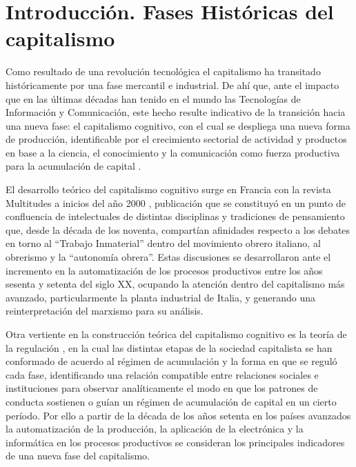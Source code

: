 \documentclass[
  spanish,
  11pt,
  a4paper,
]{scrbook}
\begin{document}
\section*{Introducción. Fases Históricas del
capitalismo}\label{introducciuxf3n.-fases-histuxf3ricas-del-capitalismo}


Como resultado de una revolución tecnológica el capitalismo ha
transitado históricamente por una fase mercantil e industrial. De ahí
que, ante el impacto que en las últimas décadas han tenido en el mundo
las Tecnologías de Información y Comunicación, este hecho resulte
indicativo de la transición hacia una nueva fase: el capitalismo
cognitivo, con el cual se despliega una nueva forma de producción,
identificable por el crecimiento sectorial de actividad y productos en
base a la ciencia, el conocimiento y la comunicación como fuerza
productiva para la acumulación de capital \autocite{Ordonez2011}.

El desarrollo teórico del capitalismo cognitivo surge en Francia con la
revista Multitudes a inicios del año 2000 \autocite[28]{Miguez2013},
publicación que se constituyó en un punto de confluencia de
intelectuales de distintas disciplinas y tradiciones de pensamiento que,
desde la década de los noventa, compartían afinidades respecto a los
debates en torno al ``Trabajo Inmaterial'' dentro del movimiento obrero
italiano, al obrerismo y la ``autonomía obrera''. Estas discusiones se
desarrollaron ante el incremento en la automatización de los procesos
productivos entre los años sesenta y setenta del siglo XX, ocupando la
atención dentro del capitalismo más avanzado, particularmente la planta
industrial de Italia, y generando una reinterpretación del marxismo para
su análisis.

Otra vertiente en la construcción teórica del capitalismo cognitivo es
la teoría de la regulación \autocite{Aglietta1979}, en la cual las
distintas etapas de la sociedad capitalista se han conformado de acuerdo
al régimen de acumulación y la forma en que se reguló cada fase,
identificando una relación compatible entre relaciones sociales e
instituciones para observar analíticamente el modo en que los patrones
de conducta sostienen o guían un régimen de acumulación de capital en un
cierto período. Por ello a partir de la década de los años setenta en
los países avanzados la automatización de la producción, la aplicación
de la electrónica y la informática en los procesos productivos se
consideran los principales indicadores de una nueva fase del
capitalismo.
\end{document}
